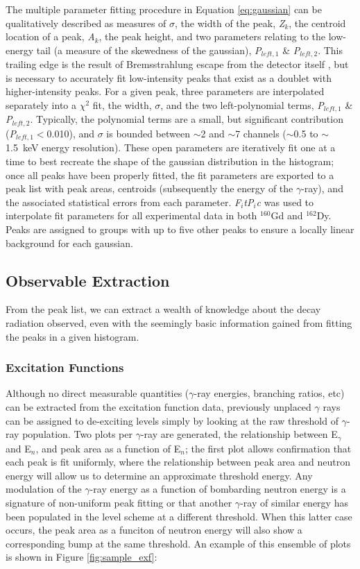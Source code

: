 The multiple parameter fitting procedure in Equation \ref{eq:gaussian} can be qualitatively described as measures of \textit{$\sigma$}, the width of the peak, \textit{Z$_k$}, the centroid location of a peak, \textit{A$_k$}, the peak height, and two parameters relating to the low-energy tail (a measure of the skewedness of the gaussian), \textit{P$_{left,1}$} \& \textit{P$_{left,2}$}. This trailing edge is the result of Bremsstrahlung escape from the detector itself \cite{Knoll_text}, but is necessary to accurately fit low-intensity peaks that exist as a doublet with higher-intensity peaks. For a given peak, three parameters are interpolated separately into a $\chi^2$ fit, the width, $\sigma$, and the two left-polynomial terms, \textit{P$_{left,1}$} \& \textit{P$_{left,2}$}. Typically, the polynomial terms are a small, but significant contribution (\textit{P$_{left,1}$}$<$0.010), and $\sigma$ is bounded between $\sim$2 and $\sim$7 channels ($\sim$0.5 to $\sim$1.5~keV energy resolution). These open parameters are iteratively fit one at a time to best recreate the shape of the gaussian distribution in the histogram; once all peaks have been properly fitted, the fit parameters are exported to a peak list with peak areas, centroids (subsequently the energy of the $\gamma$-ray), and the associated statistical errors from each parameter. \textit{F$_i$tP$_i$c} \cite{FitPic_Fribourg} was used to interpolate fit parameters for all experimental data in both $^{160}$Gd and $^{162}$Dy. Peaks are assigned to groups with up to five other peaks to ensure a locally linear background for each gaussian. 
\subsection{Observable Extraction}
From the peak list, we can extract a wealth of knowledge about the decay radiation observed, even with the seemingly basic information gained from fitting the peaks in a given histogram.
\subsubsection{Excitation Functions}\label{sec:excitation_functions}
Although no direct measurable quantities ($\gamma$-ray energies, branching ratios, etc) can be extracted from the excitation function data, previously unplaced $\gamma$ rays can be assigned to de-exciting levels simply by looking at the raw threshold of $\gamma$-ray population. Two plots per $\gamma$-ray are generated, the relationship between E$_\gamma$ and E$_n$, and peak area as a function of E$_n$; the first plot allows confirmation that each peak is fit uniformly, where the relationship between peak area and neutron energy will allow us to determine an approximate threshold energy. Any modulation of the $\gamma$-ray energy as a function of bombarding neutron energy is a signature of non-uniform peak fitting or that another $\gamma$-ray of similar energy has been populated in the level scheme at a different threshold. When this latter case occurs, the peak area as a funciton of neutron energy will also show a corresponding bump at the same threshold. An example of this ensemble of plots is shown in Figure \ref{fig:sample_exf}:


